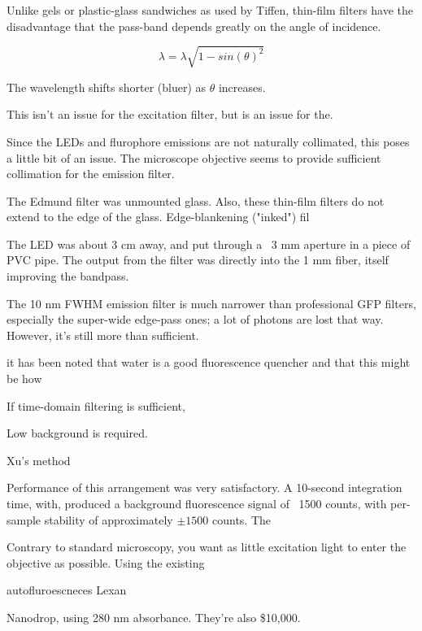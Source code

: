 \documentclass[paper.tex]{subfiles}
\begin{document}
Unlike gels or plastic-glass sandwiches as used by Tiffen, thin-film filters have the disadvantage that the pass-band depends greatly on the angle of incidence.  

$$\lambda = \lambda \sqrt{1-sin(\theta)^2}$$

The wavelength shifts shorter (bluer) as $\theta$ increases.

This isn't an issue for the excitation filter, but is an issue for the.

Since the LEDs and flurophore emissions are not naturally collimated, this poses a little bit of an issue.
The microscope objective seems to provide sufficient collimation for the emission filter.

The Edmund filter was unmounted glass. Also, these thin-film filters do not extend to the edge of the glass. Edge-blankening ("inked") fil



The LED was about 3 cm away, and put through a ~3 mm aperture in a piece of PVC pipe. The output from the filter was directly into the 1 mm fiber, itself improving the bandpass.





The 10 nm FWHM emission filter is much narrower than professional GFP filters, especially the super-wide edge-pass ones; a lot of photons are lost that way. However, it's still more than sufficient. 




it has been noted that water is a good fluorescence quencher and that this might be how 



If time-domain filtering is sufficient, 

Low background is required.

Xu's method \cite{Quantification2020}

Performance of this arrangement was very satisfactory. A 10-second integration time, with, produced a background fluorescence signal of ~1500 counts, with per-sample stability of approximately $\pm 1500$ counts. The  



Contrary to standard microscopy, you want as little excitation light to enter the objective as possible. Using the existing 

autofluroescneces Lexan

Nanodrop, using 280 nm absorbance. They're also \$10,000.
\end{document}
